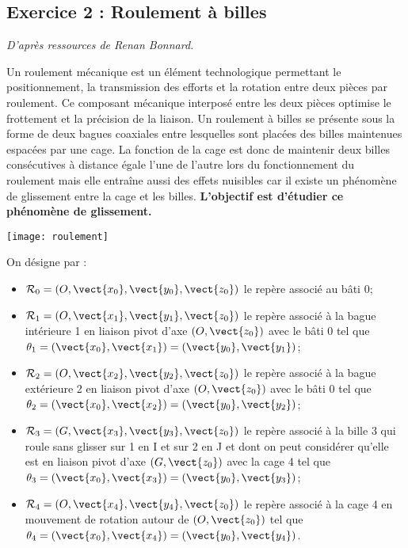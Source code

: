 \subsection*{Exercice 2 : Roulement à billes}
\setcounter{numques}{0}
\begin{flushleft}
\textit{D'après ressources de Renan Bonnard.}
\end{flushleft}

Un roulement mécanique est un élément technologique permettant le positionnement, la transmission des efforts et la rotation entre deux pièces par roulement. Ce composant mécanique interposé entre les deux pièces optimise le frottement et la précision de la liaison. Un roulement à billes se présente sous la forme de deux bagues coaxiales entre lesquelles sont placées des billes maintenues espacées par une cage. La fonction de la cage est donc de maintenir deux billes consécutives à distance égale l'une de l'autre lors du fonctionnement du roulement mais elle entraîne aussi des effets nuisibles car il existe un phénomène de glissement entre la cage et les billes. \textbf {L'objectif est d'étudier ce phénomène de glissement.}

\begin{center}
 \texttt{[image: roulement]}
\end{center}

On désigne par :
\begin{itemize}
\item $\mathcal{R}_0 = \left(O,\vect{x_0},\vect{y_0},\vect{z_0}\right)$ le repère associé au bâti 0;
\item $\mathcal{R}_1 = \left(O,\vect{x_1},\vect{y_1},\vect{z_0}\right)$ le repère associé à la bague intérieure 1 en liaison pivot d'axe $(O,\vect{z_0})$ avec le bâti 0 tel que $\theta_1 = \left(\vect{x_0},\vect{x_1}\right) = \left(\vect{y_0},\vect{y_1}\right)$;
\item $\mathcal{R}_2 = \left(O,\vect{x_2},\vect{y_2},\vect{z_0}\right)$ le repère associé à la bague extérieure 2 en liaison pivot d'axe $(O,\vect{z_0})$ avec le bâti 0 tel que $\theta_2 = \left(\vect{x_0},\vect{x_2}\right) = \left(\vect{y_0},\vect{y_2}\right)$;
\item $\mathcal{R}_3 = \left(G,\vect{x_3},\vect{y_3},\vect{z_0}\right)$ le repère associé à la bille 3 qui roule sans glisser sur 1 en I et sur 2 en J et dont on peut considérer qu'elle est en liaison pivot d'axe $(G,\vect{z_0})$ avec la cage 4 tel que $\theta_3 = \left(\vect{x_0},\vect{x_3}\right) = \left(\vect{y_0},\vect{y_3}\right)$;
\item $\mathcal{R}_4 = \left(O,\vect{x_4},\vect{y_4},\vect{z_0}\right)$ le repère associé à la cage 4 en mouvement de rotation autour de $(O,\vect{z_0})$ tel que $\theta_4 = \left(\vect{x_0},\vect{x_4}\right) = \left(\vect{y_0},\vect{y_4}\right)$.
\end{itemize}

